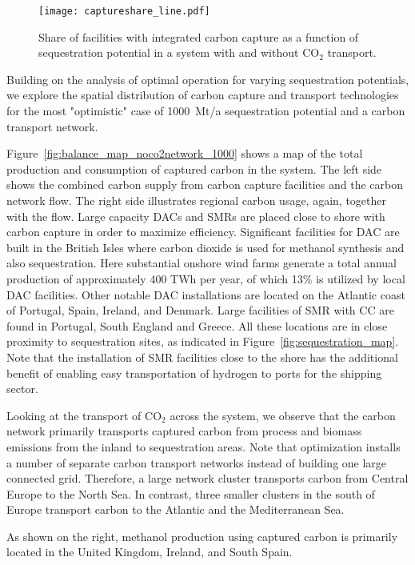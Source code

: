 \documentclass[conference]{IEEEtran}
\newcommand{\carbon}{CO$_2$}
\begin{document}
\begin{figure}[h]
    \centering
    \texttt{[image: captureshare\_line.pdf]}
    \caption{Share of facilities with integrated carbon capture as a function of sequestration potential in a system with and without \carbon{} transport.}
    \label{fig:captureshare_line}
\end{figure}

Building on the analysis of optimal operation for varying sequestration potentials, we explore the spatial distribution of carbon capture and transport technologies for the most "optimistic" case of 1000~Mt/a sequestration potential and a carbon transport network.

Figure~\ref{fig:balance_map_noco2network_1000} shows a map of the total production and consumption of captured carbon in the system. The left side shows the combined carbon supply from carbon capture facilities and the carbon network flow. The right side illustrates regional carbon usage, again, together with the flow. Large capacity DACs and SMRs are placed close to shore with carbon capture in order to maximize efficiency. Significant facilities for DAC are built in the British Isles where carbon dioxide is used for methanol synthesis and also sequestration. Here substantial onshore wind farms generate a total annual production of approximately 400 TWh per year, of which 13\% is utilized by local DAC facilities. Other notable DAC installations are located on the Atlantic coast of Portugal, Spain, Ireland, and Denmark. Large facilities of SMR with CC are found in Portugal, South England and Greece. All these locations are in close proximity to sequestration sites, as indicated in Figure~\ref{fig:sequestration_map}. Note that the installation of SMR facilities close to the shore has the additional benefit of enabling easy transportation of hydrogen to ports for the shipping sector.


Looking at the transport of \carbon{} across the system, we observe that the carbon network primarily transports captured carbon from process and biomass emissions from the inland to sequestration areas. Note that optimization installs a number of separate carbon transport networks instead of building one large connected grid. Therefore, a large network cluster transports carbon from Central Europe to the North Sea. In contrast, three smaller clusters in the south of Europe transport carbon to the Atlantic and the Mediterranean Sea.

As shown on the right, methanol production using captured carbon is primarily located in the United Kingdom, Ireland, and South Spain.
\end{document}
